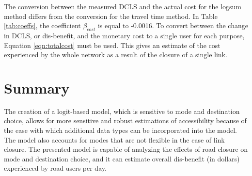 The conversion between the measured DCLS and the actual cost for the logsum method differs from the conversion for the travel time method.
In Table \ref{tab:coeffs}, the coefficient \(\beta_{cost}\) is equal to -0.0016.
To convert between the change in DCLS, or dis-benefit, and the monetary cost to a
single user for each purpose, Equation \ref{eqn:totalcost} must be used.
This gives an estimate of the cost experienced by the whole network as a result
of the closure of a single link.

\section{Summary}

The creation of a logit-based model, which is sensitive to mode and destination
choice, allows for more sensitive and robust estimations of accessibility because
of the ease with which additional data types can be incorporated into the model. The
model also accounts for modes that are not flexible in the case of link
closure. The presented model is capable of analyzing the effects of
road closure on mode and destination choice, and it can estimate overall
dis-benefit (in dollars) experienced by road users per day.

